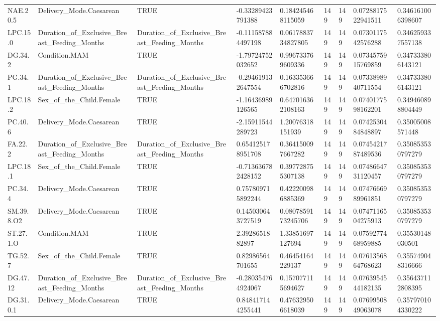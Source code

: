 \begin{longtable}{lllllllll}
NAE.20.5 & Delivery\_Mode.Caesarean & TRUE & -0.33289423791388 & 0.184245468115059 & 149 & 149 & 0.0728817522941511 & 0.346161006398607 \\
LPC.15.0 & Duration\_of\_Exclusive\_Breast\_Feeding\_Months & Duration\_of\_Exclusive\_Breast\_Feeding\_Months & -0.111587884497198 & 0.0617883734827805 & 149 & 149 & 0.0730117542576288 & 0.346259337557138 \\
DG.34.2 & Condition.MAM & TRUE & -1.79724752032652 & 0.996733769609336 & 149 & 149 & 0.0734575915769859 & 0.347333806143121 \\
PG.34.1 & Duration\_of\_Exclusive\_Breast\_Feeding\_Months & Duration\_of\_Exclusive\_Breast\_Feeding\_Months & -0.294619132647554 & 0.163353666702816 & 149 & 149 & 0.0733898940711554 & 0.347333806143121 \\
LPC.18.2 & Sex\_of\_the\_Child.Female & TRUE & -1.16436989126565 & 0.647016362108163 & 149 & 149 & 0.0740177598162201 & 0.349460898804449 \\
PC.40.6 & Delivery\_Mode.Caesarean & TRUE & -2.15911544289723 & 1.20076318151939 & 149 & 149 & 0.0742530484848897 & 0.35005008571448 \\
FA.22.2 & Duration\_of\_Exclusive\_Breast\_Feeding\_Months & Duration\_of\_Exclusive\_Breast\_Feeding\_Months & 0.654125178951708 & 0.364150097667282 & 149 & 149 & 0.0745421787489536 & 0.350853530797279 \\
LPC.18.1 & Sex\_of\_the\_Child.Female & TRUE & -0.713636782428152 & 0.397728755307138 & 149 & 149 & 0.0748664731120457 & 0.350853530797279 \\
PC.34.4 & Delivery\_Mode.Caesarean & TRUE & 0.757809715892244 & 0.422200986885369 & 149 & 149 & 0.0747666989961851 & 0.350853530797279 \\
SM.39.8.O2 & Delivery\_Mode.Caesarean & TRUE & 0.145030643727519 & 0.0807859173245706 & 149 & 149 & 0.0747116504275913 & 0.350853530797279 \\
ST.27.1.O & Condition.MAM & TRUE & 2.3928651882897 & 1.33851697127694 & 149 & 149 & 0.0759277468959885 & 0.35530148030501 \\
TG.52.7 & Sex\_of\_the\_Child.Female & TRUE & 0.82986564701655 & 0.46454164229137 & 149 & 149 & 0.0761356864768623 & 0.355749048316666 \\
DG.47.12 & Duration\_of\_Exclusive\_Breast\_Feeding\_Months & Duration\_of\_Exclusive\_Breast\_Feeding\_Months & -0.280354764924067 & 0.157077115694627 & 149 & 149 & 0.0763954544182135 & 0.356437112808395 \\
DG.31.0.1 & Delivery\_Mode.Caesarean & TRUE & 0.848417144255441 & 0.476329506618039 & 149 & 149 & 0.0769950849063078 & 0.357970104330222 \\

\end{longtable}
